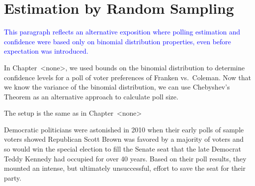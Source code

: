 \begin{problems}
\practiceproblems
{}

\classproblems
{}

\homeworkproblems
{}

\examproblems
{}

\end{problems}


\section{Estimation by Random Sampling}

\begin{editingnotes}

\textcolor{blue}{This paragraph reflects an alternative exposition
  where polling estimation and confidence were based only on binomial
  distribution properties, even before expectation was introduced.}

In Chapter~<none>, we used bounds on the binomial distribution to determine
confidence levels for a poll of voter preferences of Franken vs.\ Coleman.
Now that we know the variance of the binomial distribution, we can use
Chebyshev's Theorem as an alternative approach to calculate poll size.

The setup is the same as in Chapter~<none>
\end{editingnotes}

Democratic politicians were astonished in 2010 when their early polls
of sample voters showed Republican Scott Brown was favored by a
majority of voters and so would win the special election to fill the
Senate seat that the late Democrat Teddy Kennedy had occupied for over
40 years.  Based on their poll results, they mounted an intense, but
ultimately unsuccessful, effort to save the seat for their party.

